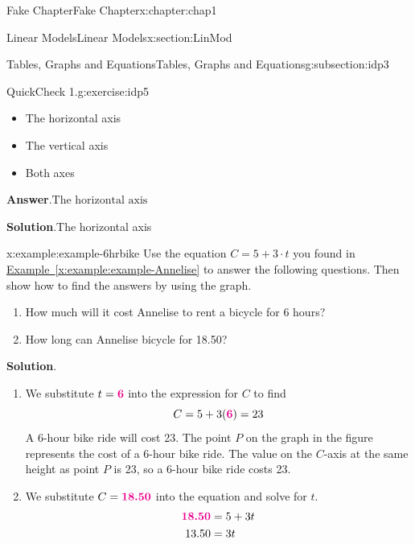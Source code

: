 \documentclass[oneside,10pt,]{book}
\newcommand{\blocktitlefont}{\relax}
\newcommand{\xreffont}{\relax}
\numberwithin{equation}{section}
\newcommand{\alert}[1]{\boldsymbol{\color{magenta}{#1}}}
\newcommand{\amp}{&}
\begin{document}
\begin{chapterptx}{Fake Chapter}{}{Fake Chapter}{}{}{x:chapter:chap1}
\begin{sectionptx}{Linear Models}{}{Linear Models}{}{}{x:section:LinMod}
\begin{subsectionptx}{Tables, Graphs and Equations}{}{Tables, Graphs and Equations}{}{}{g:subsection:idp3}
\begin{inlineexercise}{QuickCheck 1.}{g:exercise:idp5}
\begin{itemize}[label=$\odot$,leftmargin=3em,]
\item{}The horizontal axis%

\item{}The vertical axis%

\item{}Both axes%

\end{itemize}
%
\par\smallskip%
\noindent\textbf{\blocktitlefont Answer}.\hypertarget{g:answer:idp6}{}\quad{}\(\text{The horizontal axis}\)%
\par\smallskip%
\noindent\textbf{\blocktitlefont Solution}.\hypertarget{g:solution:idp7}{}\quad{}The horizontal axis%
\end{inlineexercise}%
\begin{example}{}{x:example:example-6hrbike}%
Use the equation \(C=5+3\cdot t\) you found in \hyperref[x:example:example-Annelise]{Example~{\xreffont\ref{x:example:example-Annelise}}} to answer the following questions.  Then show how to find the answers by using the graph.%
\par
%
\begin{enumerate}[label=\alph*]
\item{}How much will it cost Annelise to rent a bicycle for 6 hours?%
\item{}How long can Annelise bicycle for \textdollar{}18.50?%
\end{enumerate}
%
\par\smallskip%
\noindent\textbf{\blocktitlefont Solution}.\hypertarget{g:solution:idp8}{}\quad{}%
\begin{enumerate}[label=\alph*]
\item{}We substitute \(t=\alert{6}\) into the expression for \(C\) to find%
\begin{equation*}
C=5+3(\alert{6})=23
\end{equation*}
A 6-hour bike ride will cost \textdollar{}23.  The point \(P\) on the graph in the figure represents the cost of a 6-hour bike ride.  The value on the \(C\)-axis at the same height as point \(P\) is 23, so a 6-hour bike ride costs \textdollar{}23.%
\item{}\begin{sidebyside}{2}{0.0125}{0.0125}{0.025}%
\begin{sbspanel}{0.6}%
We substitute \(C=\alert{18.50}\) into the equation and solve for \(t\).%
\begin{align*}
\alert{18.50}\amp=5+3t\\
13.50\amp=3t\\

\end{align*}
\end{sbspanel}
\end{sidebyside}
\end{enumerate}
\end{example}
\end{subsectionptx}
\end{sectionptx}
\end{chapterptx}
\end{document}
